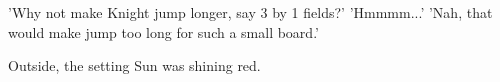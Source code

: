 \noindent
'Why not make Knight jump longer, say 3 by 1 fields?'\newline
'Hmmmm...'\newline
'Nah, that would make jump too long for such a small board.'

Outside, the setting Sun was shining red.

\vspace*{1.1\baselineskip}
\begin{flushright}
\parbox{0.6\textwidth}{
\emph{\hspace*{\fill}{late November, 1975}\newline
\hspace*{\fill}{Bednja, Croatia}}}
\end{flushright}

\clearpage %
